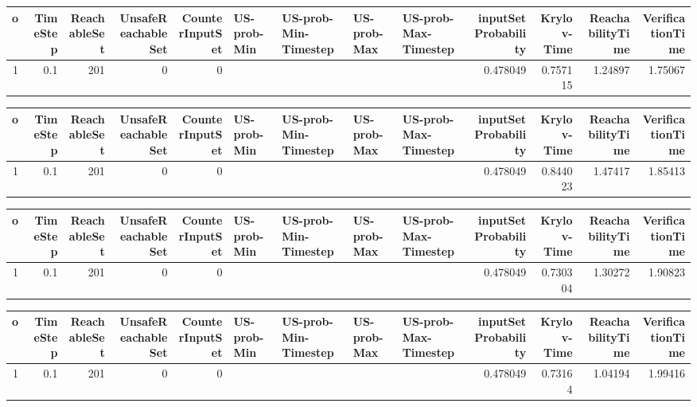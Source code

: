\begin{tabular}{rrrrrllllrrrr}
\hline
   o &   TimeStep &   ReachableSet &   UnsafeReachableSet &   CounterInputSet & US-prob-Min   & US-prob-Min-Timestep   & US-prob-Max   & US-prob-Max-Timestep   &   inputSet Probability &   Krylov-Time &   ReachabilityTime &   VerificationTime \\
\hline
   1 &        0.1 &            201 &                    0 &                 0 &               &                        &               &                        &               0.478049 &      0.757115 &            1.24897 &            1.75067 \\
\hline
\end{tabular}
\begin{tabular}{rrrrrllllrrrr}
\hline
   o &   TimeStep &   ReachableSet &   UnsafeReachableSet &   CounterInputSet & US-prob-Min   & US-prob-Min-Timestep   & US-prob-Max   & US-prob-Max-Timestep   &   inputSet Probability &   Krylov-Time &   ReachabilityTime &   VerificationTime \\
\hline
   1 &        0.1 &            201 &                    0 &                 0 &               &                        &               &                        &               0.478049 &      0.844023 &            1.47417 &            1.85413 \\
\hline
\end{tabular}
\begin{tabular}{rrrrrllllrrrr}
\hline
   o &   TimeStep &   ReachableSet &   UnsafeReachableSet &   CounterInputSet & US-prob-Min   & US-prob-Min-Timestep   & US-prob-Max   & US-prob-Max-Timestep   &   inputSet Probability &   Krylov-Time &   ReachabilityTime &   VerificationTime \\
\hline
   1 &        0.1 &            201 &                    0 &                 0 &               &                        &               &                        &               0.478049 &      0.730304 &            1.30272 &            1.90823 \\
\hline
\end{tabular}
\begin{tabular}{rrrrrllllrrrr}
\hline
   o &   TimeStep &   ReachableSet &   UnsafeReachableSet &   CounterInputSet & US-prob-Min   & US-prob-Min-Timestep   & US-prob-Max   & US-prob-Max-Timestep   &   inputSet Probability &   Krylov-Time &   ReachabilityTime &   VerificationTime \\
\hline
   1 &        0.1 &            201 &                    0 &                 0 &               &                        &               &                        &               0.478049 &       0.73164 &            1.04194 &            1.99416 \\
\hline
\end{tabular}
